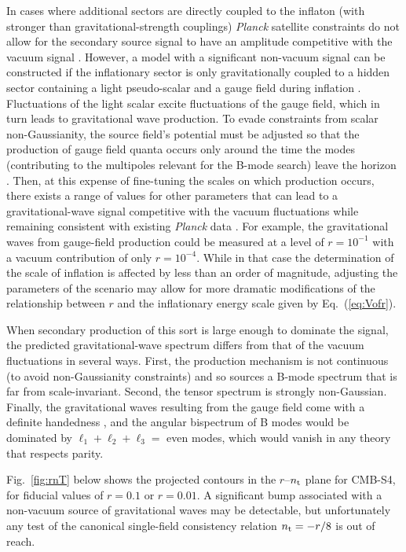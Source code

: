 In cases where additional sectors are directly coupled to the inflaton (with stronger than gravitational-strength couplings) {\it Planck\/} satellite constraints do not allow for the secondary source signal to have an amplitude competitive with the vacuum signal \cite{Ozsoy:2014sba,Mirbabayi:2014jqa}. However, a model with a significant non-vacuum signal can be constructed if the inflationary sector is only gravitationally coupled to a hidden sector containing a light pseudo-scalar and a gauge field during inflation \cite{Barnaby:2012xt,Peloso:2016gqs}. Fluctuations of the light scalar excite fluctuations of the gauge field, which in turn leads to gravitational wave production. To evade constraints from scalar non-Gaussianity, the source field's potential must be adjusted so that the production of gauge field quanta occurs only around the time the modes (contributing to the multipoles relevant for the B-mode search) leave the horizon \cite{Namba:2015gja}. Then, at this expense of fine-tuning the scales on which production occurs, there exists a range of values for other parameters that can lead to a gravitational-wave signal competitive with the vacuum fluctuations while remaining consistent with existing {\it Planck\/} data \cite{Namba:2015gja,Peloso:2016gqs}. For example, the gravitational waves from gauge-field production could be measured at a level of $r=10^{-1}$ with a vacuum contribution of only $r=10^{-4}$. While in that case the determination of the scale of inflation is affected by less than an order of magnitude, adjusting the parameters of the scenario may allow for more dramatic modifications of the relationship between $r$ and the inflationary energy scale given by Eq.~(\ref{eq:Vofr}). 

When secondary production of this sort is large enough to dominate the signal, the predicted gravitational-wave spectrum differs from that of the vacuum fluctuations in several ways. First, the production mechanism is not continuous (to avoid non-Gaussianity constraints) and so sources a B-mode spectrum that is far from scale-invariant. Second, the tensor spectrum is strongly non-Gaussian. Finally, the gravitational waves resulting from the gauge field come with a definite handedness \cite{Anber:2006xt,Sorbo:2011rz}, and the angular bispectrum of B modes would be dominated by $\ell_1+\ell_2+\ell_3=$ even modes, which would vanish in any theory that respects parity. 

Fig.~\ref{fig:rnT} below shows the projected contours in the $r$--$n_{\rm t}$ plane for CMB-S4, for fiducial values of $r=0.1$ or $r=0.01$. A significant bump associated with a non-vacuum source of gravitational waves may be detectable, but unfortunately any test of the canonical single-field consistency relation $n_{\rm t}=-r/8$ is out of reach. 

